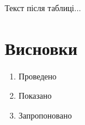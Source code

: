 \documentclass[12pt,a4paper,titlepage,oneside]{book}
\numberwithin{equation}{part}
\renewcommand{\theequation}{\thechapter.\arabic{equation}}
\begin{document}
Текст після таблиці...




\chapter*{Висновки}

\begin{enumerate}
  \item Проведено
  \item Показано
  \item Запропоновано
\end{enumerate}




%



\vspace{-5cm}
\setcounter{page}{3}







\end{document}

